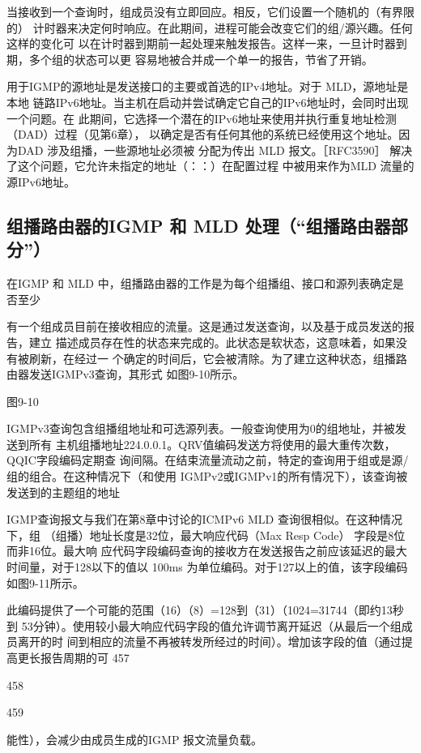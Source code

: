 当接收到一个查询时，组成员没有立即回应。相反，它们设置一个随机的（有界限的）
计时器来决定何时响应。在此期间，进程可能会改变它们的组/源兴趣。任何这样的变化可
以在计时器到期前一起处理来触发报告。这样一来，一旦计时器到期，多个组的状态可以更
容易地被合并成一个单一的报告，节省了开销。

用于IGMP的源地址是发送接口的主要或首选的IPv4地址。对于 MLD，源地址是本地
链路IPv6地址。当主机在启动并尝试确定它自己的IPv6地址时，会同时出现一个问题。在
此期间，它选择一个潜在的IPv6地址来使用并执行重复地址检测（DAD）过程（见第6章），
以确定是否有任何其他的系统已经使用这个地址。因为DAD 涉及组播，一些源地址必须被
分配为传出 MLD 报文。［RFC3590］ 解决了这个问题，它允许未指定的地址（：：）在配置过程
中被用来作为MLD 流量的源IPv6地址。

\subsection{组播路由器的IGMP 和 MLD 处理（“组播路由器部分”）}
在IGMP 和 MLD 中，组播路由器的工作是为每个组播组、接口和源列表确定是否至少

有一个组成员目前在接收相应的流量。这是通过发送查询，以及基于成员发送的报告，建立
描述成员存在性的状态来完成的。此状态是软状态，这意味着，如果没有被刷新，在经过一
个确定的时间后，它会被清除。为了建立这种状态，组播路由器发送IGMPv3查询，其形式
如图9-10所示。

图9-10

IGMPv3查询包含组播组地址和可选源列表。一般查询使用为0的组地址，并被发送到所有
主机组播地址224.0.0.1。QRV值编码发送方将使用的最大重传次数，QQIC字段编码定期查
询间隔。在结束流量流动之前，特定的查询用于组或是源/组的组合。在这种情况下（和使用
IGMPv2或IGMPv1的所有情况下），该查询被发送到的主题组的地址

IGMP查询报文与我们在第8章中讨论的ICMPv6 MLD 查询很相似。在这种情况下，组
（组播）地址长度是32位，最大响应代码（Max Resp Code） 字段是8位而非16位。最大响
应代码字段编码查询的接收方在发送报告之前应该延迟的最大时间量，对于128以下的值以
100ms 为单位编码。对于127以上的值，该字段编码如图9-11所示。

此编码提供了一个可能的范围（16）（8）=128到（31）（1024=31744（即约13秒到
53分钟）。使用较小最大响应代码字段的值允许调节离开延迟（从最后一个组成员离开的时
间到相应的流量不再被转发所经过的时间）。增加该字段的值（通过提高更长报告周期的可
457

458

459

能性），会减少由成员生成的IGMP 报文流量负载。

